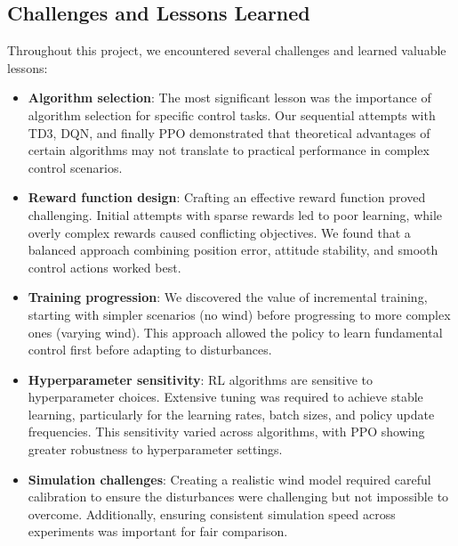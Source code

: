 \documentclass[12pt]{article}
\begin{document}

\subsection{Challenges and Lessons Learned}

Throughout this project, we encountered several challenges and learned valuable lessons:


\begin{itemize}
    \item \textbf{Algorithm selection}: The most significant lesson was the importance of algorithm selection for specific control tasks. Our sequential attempts with TD3, DQN, and finally PPO demonstrated that theoretical advantages of certain algorithms may not translate to practical performance in complex control scenarios.
    
    \item \textbf{Reward function design}: Crafting an effective reward function proved challenging. Initial attempts with sparse rewards led to poor learning, while overly complex rewards caused conflicting objectives. We found that a balanced approach combining position error, attitude stability, and smooth control actions worked best.
    
    \item \textbf{Training progression}: We discovered the value of incremental training, starting with simpler scenarios (no wind) before progressing to more complex ones (varying wind). This approach allowed the policy to learn fundamental control first before adapting to disturbances.
    
    \item \textbf{Hyperparameter sensitivity}: RL algorithms are sensitive to hyperparameter choices. Extensive tuning was required to achieve stable learning, particularly for the learning rates, batch sizes, and policy update frequencies. This sensitivity varied across algorithms, with PPO showing greater robustness to hyperparameter settings.
    
    \item \textbf{Simulation challenges}: Creating a realistic wind model required careful calibration to ensure the disturbances were challenging but not impossible to overcome. Additionally, ensuring consistent simulation speed across experiments was important for fair comparison.
\end{itemize}
\end{document}

